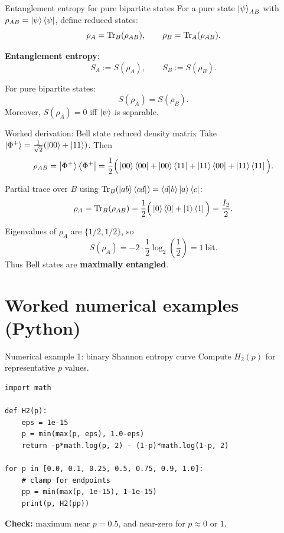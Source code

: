 \documentclass{beamer}
\begin{document}
\begin{frame}{Entanglement entropy for pure bipartite states}
For a pure state $\ket{\psi}_{AB}$ with $\rho_{AB}=\ket{\psi}\bra{\psi}$, define reduced states:
\[
\rho_A = \Tr_B(\rho_{AB}),\qquad \rho_B=\Tr_A(\rho_{AB}).
\]

\textbf{Entanglement entropy}:
\[
S_A := S(\rho_A),\qquad S_B := S(\rho_B).
\]

For pure bipartite states:
\[
S(\rho_A)=S(\rho_B).
\]
Moreover, $S(\rho_A)=0$ iff $\ket{\psi}$ is separable.
\end{frame}

\begin{frame}{Worked derivation: Bell state reduced density matrix}
Take $\ket{\Phi^+}=\frac{1}{\sqrt{2}}(\ket{00}+\ket{11})$.
Then
\[
\rho_{AB}=\ket{\Phi^+}\bra{\Phi^+}
=\frac{1}{2}\Big(\ket{00}\bra{00}+\ket{00}\bra{11}+\ket{11}\bra{00}+\ket{11}\bra{11}\Big).
\]

Partial trace over $B$ using $\Tr_B(\ket{ab}\bra{cd})=\braket{d}{b}\ket{a}\bra{c}$:
\[
\rho_A=\Tr_B(\rho_{AB})=\frac{1}{2}\Big(\ket{0}\bra{0}+\ket{1}\bra{1}\Big)=\frac{I_2}{2}.
\]

Eigenvalues of $\rho_A$ are $\{1/2,1/2\}$, so
\[
S(\rho_A)= -2\cdot\frac{1}{2}\log_2\left(\frac{1}{2}\right)=1~\text{bit}.
\]
Thus Bell states are \textbf{maximally entangled}.
\end{frame}

\section{Worked numerical examples (Python)}

\begin{frame}[fragile]{Numerical example 1: binary Shannon entropy curve}
Compute $H_2(p)$ for representative $p$ values.
\begin{lstlisting}
import math

def H2(p):
    eps = 1e-15
    p = min(max(p, eps), 1.0-eps)
    return -p*math.log(p, 2) - (1-p)*math.log(1-p, 2)

for p in [0.0, 0.1, 0.25, 0.5, 0.75, 0.9, 1.0]:
    # clamp for endpoints
    pp = min(max(p, 1e-15), 1-1e-15)
    print(p, H2(pp))
\end{lstlisting}

\textbf{Check:} maximum near $p=0.5$, and near-zero for $p\approx 0$ or $1$.
\end{frame}
\end{document}

